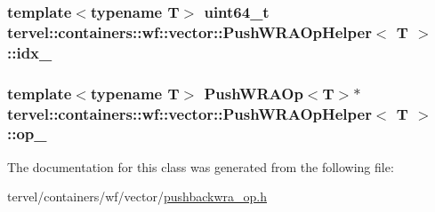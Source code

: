 \subsubsection[{idx\+\_\+}]{\setlength{\rightskip}{0pt plus 5cm}template$<$typename T$>$ uint64\+\_\+t {\bf tervel\+::containers\+::wf\+::vector\+::\+Push\+W\+R\+A\+Op\+Helper}$<$ T $>$\+::idx\+\_\+\hspace{0.3cm}{\ttfamily [private]}}\label{classtervel_1_1containers_1_1wf_1_1vector_1_1_push_w_r_a_op_helper_a059176bc02e87fbbe4fe344ef63630ea}
\hypertarget{classtervel_1_1containers_1_1wf_1_1vector_1_1_push_w_r_a_op_helper_adcb96f369c052a709fa3b2a5ea12d642}{}
\subsubsection[{op\+\_\+}]{\setlength{\rightskip}{0pt plus 5cm}template$<$typename T$>$ {\bf Push\+W\+R\+A\+Op}$<$T$>$$\ast$ {\bf tervel\+::containers\+::wf\+::vector\+::\+Push\+W\+R\+A\+Op\+Helper}$<$ T $>$\+::op\+\_\+\hspace{0.3cm}{\ttfamily [private]}}\label{classtervel_1_1containers_1_1wf_1_1vector_1_1_push_w_r_a_op_helper_adcb96f369c052a709fa3b2a5ea12d642}


The documentation for this class was generated from the following file\+:\begin{DoxyCompactItemize}
\item 
tervel/containers/wf/vector/\hyperlink{pushbackwra__op_8h}{pushbackwra\+\_\+op.\+h}\end{DoxyCompactItemize}
